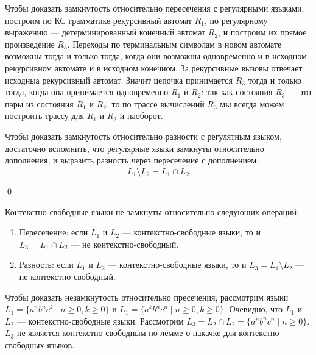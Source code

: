 Чтобы доказать замкнутость относительно пересечения с регулярными языками, построим по КС грамматике рекурсивный автомат $R_1$, по регулярному выражению --- детерминированный конечный автомат $R_2$, и построим их прямое произведение $R_3$.
Переходы по терминальным символам в новом автомате возможны тогда и только тогда, когда они возможны одновременно и в исходном рекурсивном автомате и в исходном конечном. 
За рекурсивные вызовы отвечает исходныа рекурсивный автомат. 
Значит цепочка принимается $R_3$ тогда и только тогда, когда она принимается одновременно $R_1$ и $R_2$: так как состояния $R_3$ --- это пары из состояния $R_1$ и $R_2$, то по трассе вычислений $R_3$ мы всегда можем построить трассу для $R_1$ и $R_2$ и наоборот.

Чтобы доказать замкнутость относительно разности с регулятным языком, достаточно вспомнить, что регулярные языки замкнуты относительно дополнения, и выразить разность через пересечение с дополнением: 
$$
L_1 \setminus L_2 = L_1 \cap \overline{L_2}
$$

\qed

\begin{theorem}
Контекстно-свободные языки не замкнуты относительно следующих операций:
\begin{enumerate}
  \item Пересечение: если $L_1$ и $L_2$ --- контекстно-свободные языки, то и $L_3 = L_1 \cap L_2$ --- не контекстно-свободный.
  \item Разность: если $L_1$ и $L_2$ --- контекстно-свободные языки, то и $L_3 = L_1 \setminus L_2$ --- не контекстно-свободный.
\end{enumerate}
\end{theorem}

Чтобы доказать незамкнутость относительно пресечения, рассмотрим языки $L_1 = \{a^n b^n c^k \mid n \geq 0, k \geq 0\}$ и $L_1 = \{a^k b^n c^n \mid n \geq 0, k \geq 0\}$.
Очевидно, что $L_1$ и $L_2$ --- контекстно-свободные языки.
Рассмотрим $L_3 = L_2 \cap L_2 = \{a^n b^n c^n \mid n \geq 0\}$. 
$L_3$ не является контекстно-свободным по лемме о накачке для контекстно-свободных языков.

